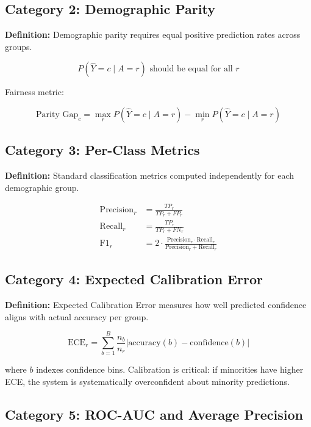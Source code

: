 \documentclass[11pt,a4paper,oneside]{report}
\begin{document}
\subsection{Category 2: Demographic Parity}

\textbf{Definition:} Demographic parity requires equal positive prediction rates across groups.

\begin{equation}
P(\hat{Y} = c \mid A = r) \text{ should be equal for all } r
\end{equation}

Fairness metric:

\begin{equation}
\text{Parity Gap}_c = \max_r P(\hat{Y}=c \mid A=r) - \min_r P(\hat{Y}=c \mid A=r)
\end{equation}

\subsection{Category 3: Per-Class Metrics}

\textbf{Definition:} Standard classification metrics computed independently for each demographic group.

\begin{align}
\text{Precision}_r &= \frac{TP_r}{TP_r + FP_r} \\
\text{Recall}_r &= \frac{TP_r}{TP_r + FN_r} \\
\text{F1}_r &= 2 \cdot \frac{\text{Precision}_r \cdot \text{Recall}_r}{\text{Precision}_r + \text{Recall}_r}
\end{align}

\subsection{Category 4: Expected Calibration Error}

\textbf{Definition:} Expected Calibration Error measures how well predicted confidence aligns with actual accuracy per group.

\begin{equation}
\text{ECE}_r = \sum_{b=1}^{B} \frac{n_b}{n_r} \left| \text{accuracy}(b) - \text{confidence}(b) \right|
\end{equation}

where $b$ indexes confidence bins. Calibration is critical: if minorities have higher ECE, the system is systematically overconfident about minority predictions.

\subsection{Category 5: ROC-AUC and Average Precision}
\end{document}
